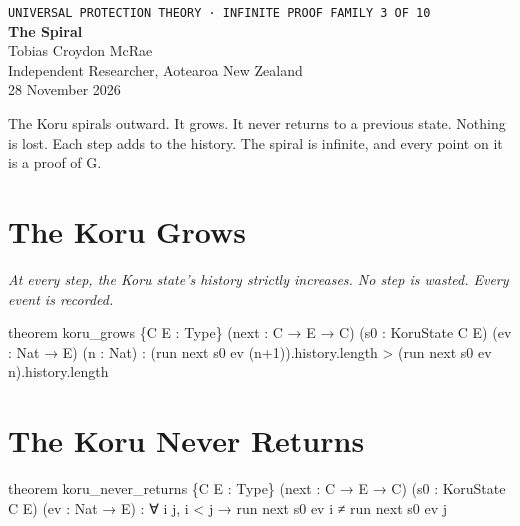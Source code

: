 




\begin{center}
{\small\texttt{UNIVERSAL PROTECTION THEORY · INFINITE PROOF FAMILY 3 OF 10}}\\[1.5em]
{\Huge\bfseries\color{korugreen} The Spiral}\\[1em]
{\large Tobias Croydon McRae}\\[0.3em]
{\small Independent Researcher, Aotearoa New Zealand}\\[0.3em]
{\small 28 November 2026}
\end{center}

\bigskip

\noindent The Koru spirals outward. It grows. It never returns to a previous state. Nothing is lost. Each step adds to the history. The spiral is infinite, and every point on it is a proof of G.

\section{The Koru Grows}

\begin{theorembox}
\itshape At every step, the Koru state's history strictly increases. No step is wasted. Every event is recorded.
\end{theorembox}

\begin{leancode}
theorem koru_grows \{C E : Type\} (next : C → E → C)
     (s0 : KoruState C E) (ev : Nat → E) (n : Nat) :
     (run next s0 ev (n+1)).history.length >
     (run next s0 ev n).history.length
\end{leancode}

\axiombadge

\section{The Koru Never Returns}

\begin{leancode}
theorem koru_never_returns \{C E : Type\} (next : C → E → C)
     (s0 : KoruState C E) (ev : Nat → E) :
     ∀ i j, i < j → run next s0 ev i ≠ run next s0 ev j
\end{leancode}

